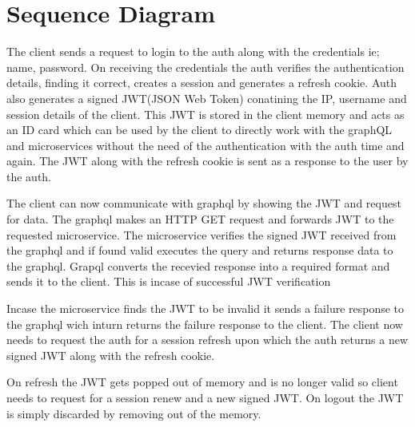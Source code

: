 \section{Sequence Diagram}

The client sends a request to login to the auth along with the credentials ie; name, password.
On receiving the credentials the auth verifies the authentication details, finding it correct, creates a session and generates a refresh cookie.
Auth also generates a signed JWT(JSON Web Token) conatining the IP, username and session details of the client.
This JWT is stored in the client memory and acts as an ID card which can be used by the client to directly work with the graphQL and microservices without the need of the authentication with the auth time and again.
The JWT along with the refresh cookie is sent as a response to the user by the auth.

The client can now communicate with graphql by showing the JWT and request for data.
The graphql makes an HTTP GET request and forwards JWT to the requested microservice.
The microservice verifies the signed JWT received from the graphql and if found valid executes the query and returns response data to the graphql.
Grapql converts the recevied response into a required format and sends it to the client.
This is incase of successful JWT verification

Incase the microservice finds the JWT to be invalid it sends a failure response to the graphql wich inturn returns the failure response to the client.
The client now needs to request the auth for a session refresh upon which the auth returns a new signed JWT along with the refresh cookie.

On refresh the JWT gets popped out of memory and is no longer valid so client needs to request for a session renew and a new signed JWT.
On logout the JWT is simply discarded by removing out of the memory. 

